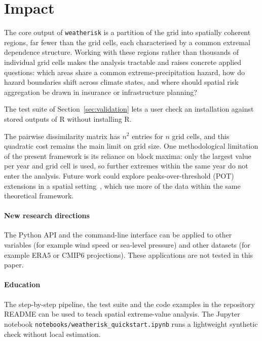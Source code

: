 \documentclass[preprint,12pt,a4paper]{elsarticle}
\newcommand{\rev}[1]{{#1}}
\newcommand{\revg}[1]{{#1}}
\newcommand{\revo}[1]{{#1}}
\newcommand{\revr}[1]{{#1}}
\begin{document}
\FloatBarrier

\section{Impact}
\label{sec:impact}

\revg{The core output of \texttt{weatherisk} is a partition of the
grid into spatially coherent regions, far fewer than the grid cells, each characterised by a common extremal
dependence structure. Working with these regions rather than
thousands of individual grid cells makes the analysis tractable and
raises concrete applied questions: which areas share a common
extreme-precipitation hazard, how do hazard boundaries shift across
climate states, and where should spatial risk aggregation be drawn
in insurance or infrastructure planning?}

\rev{The test suite of Section~\ref{sec:validation} lets a user check an
installation against stored outputs of R without installing R.}

\revg{The pairwise dissimilarity matrix has $n^2$ entries for $n$
grid cells, and this quadratic cost remains the main limit on grid
size.}
\revg{\revo{One methodological limitation of} the present framework is
its reliance on block maxima\revr{: only the largest value per year
and grid cell is used, so further extremes within the same year do
not enter the analysis}. Future work could explore peaks-over-threshold
(POT) extensions in a spatial setting~\cite{davison2012}, which use
more of the data within the same theoretical framework.}

\paragraph{New research directions}
The Python API and the command-line interface can be applied to
other variables (for example wind speed or sea-level pressure) and
other datasets (for example ERA5 or CMIP6 projections). These
applications are not tested in this paper.

\paragraph{Education}
The step-by-step pipeline, the test suite and the code examples in
the repository README can be used to teach spatial extreme-value
analysis. The Jupyter notebook
\texttt{notebooks/\allowbreak weatherisk\_quickstart.ipynb} runs a
lightweight synthetic check without local estimation.
\end{document}
